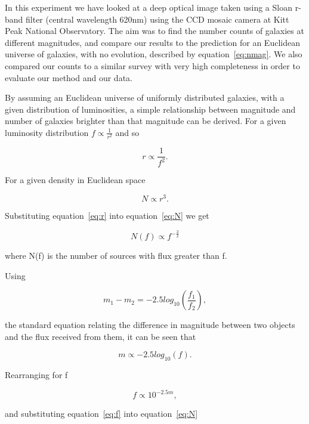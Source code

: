 \documentclass[a4paper,11pt,twoside]{article}
\begin{document}
In this experiment we have looked at a deep optical image taken using a 
Sloan r-band filter (central wavelength 620nm) using the CCD mosaic 
camera at Kitt Peak National Observatory. The aim was to find the 
number counts of galaxies at different magnitudes, and compare our 
results to the prediction for an Euclidean universe of galaxies, 
with no evolution, described by equation~\ref{eq:nmag}. We also 
compared our counts to a similar survey with very high completeness 
in order to evaluate our method and our data.

By assuming an Euclidean universe of uniformly distributed galaxies, 
with a given distribution of luminosities, a simple relationship 
between magnitude and number of galaxies brighter than that magnitude 
can be derived. For a given luminosity distribution
\(f \propto \frac{1}{r^2}\) and so

\begin{equation}
\label{eq:r}
r \propto \frac{1}{f^2}.
\end{equation} 

For a given density in Euclidean space

\begin{equation}
\label{eq:N}
N \propto r^3.
\end{equation}

Substituting equation~\ref{eq:r} into equation~\ref{eq:N} we get

\begin{equation}
N(f) \propto f^{-\frac{3}{2}}
\end{equation}

where N(f) is the number of sources with flux greater than f.

Using

\begin{equation}
m_1 - m_2 = -2.5log_{10}(\frac{f_1}{f_2}),
\end{equation}


the standard equation relating the difference in magnitude 
between two objects and the flux received from them, it can be seen that

\begin{equation}
m \propto -2.5log_{10}(f).
\end{equation}

Rearranging for f

\begin{equation}
\label{eq:f}
f \propto 10^{-2.5m},
\end{equation}

and substituting equation~\ref{eq:f} into equation~\ref{eq:N} 
\end{document}
